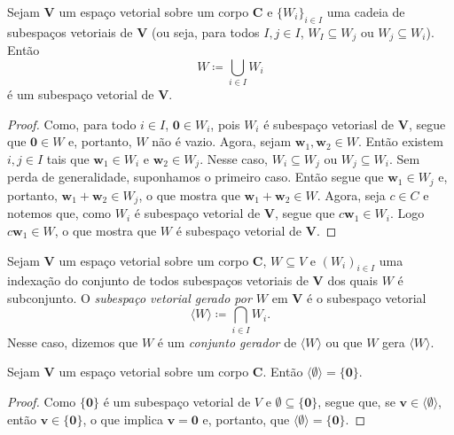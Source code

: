 \begin{prop}
	Sejam $\bm V$ um espaço vetorial sobre um corpo $\bm C$ e $\{W_i\}_{i \in I}$ uma cadeia de subespaços vetoriais de $\bm V$ (ou seja, para todos $I,j \in I$, $W_I \subseteq W_j$ ou $W_j \subseteq W_i$). Então
	\begin{equation*}
	W \coloneqq \bigcup_{i \in I} W_i
	\end{equation*}
é um subespaço vetorial de $\bm V$.
\end{prop}
\begin{proof}
	Como, para todo $i \in I$, $\bm 0 \in W_i$, pois $W_i$ é subespaço vetoriasl de $\bm V$, segue que $\bm 0 \in W$ e, portanto, $W$ não é vazio. Agora, sejam $\bm w_1,\bm w_2 \in W$. Então existem $i,j \in I$ tais que $\bm w_1 \in W_i$ e $\bm w_2 \in W_j$. Nesse caso, $W_i \subseteq W_j$ ou $W_j \subseteq W_i$. Sem perda de generalidade, suponhamos o primeiro caso. Então segue que $\bm w_1 \in W_j$ e, portanto, $\bm w_1+\bm w_2 \in W_j$, o que mostra que $\bm w_1+\bm w_2 \in W$. Agora, seja $c \in C$ e notemos que, como $W_i$ é subespaço vetorial de $\bm V$, segue que $c\bm w_1 \in W_i$. Logo $c\bm w_1 \in W$, o que mostra que $W$ é subespaço vetorial de $\bm V$.
\end{proof}

\begin{defi}
	Sejam $\bm V$ um espaço vetorial sobre um corpo $\bm C$, $W \subseteq V$ e $(W_i)_{i \in I}$ uma indexação do conjunto de todos subespaços vetoriais de $\bm V$ dos quais $W$ é subconjunto. O \emph{subespaço vetorial gerado por $W$} em $\bm V$ é o subespaço vetorial
	\begin{equation*}
	\langle W \rangle \coloneqq \bigcap_{i \in I} W_i.
	\end{equation*}
Nesse caso, dizemos que $W$ é um \emph{conjunto gerador} de $\langle W \rangle$ ou que $W$ gera $\langle W \rangle$.


\end{defi}

\begin{prop}
	Sejam $\bm V$ um espaço vetorial sobre um corpo $\bm C$. Então $\langle \emptyset \rangle = \{\bm 0\}$.
\end{prop}
\begin{proof}
	Como $\{\bm  0\}$ é um subespaço vetorial de $V$ e $\emptyset \subseteq \{\bm 0\}$, segue que, se $\bm v \in \langle \emptyset \rangle$, então $\bm v \in \{\bm 0\}$, o que implica $\bm v = \bm 0$ e, portanto, que $\langle \emptyset \rangle = \{\bm 0\}$.
\end{proof}

